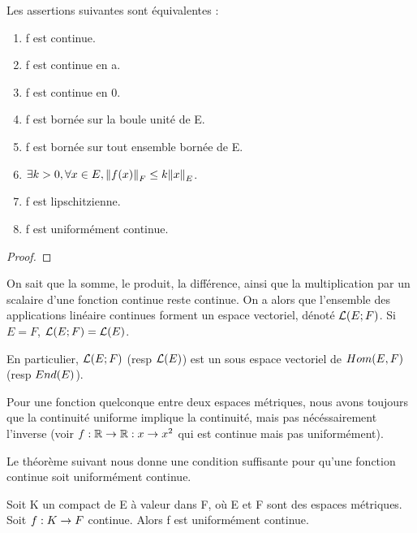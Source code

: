 \begin{proposition}
	Les assertions suivantes sont équivalentes :

	\begin{enumerate}
		\item f est continue.
		\item f est continue en a.
		\item f est continue en 0.
		\item f est bornée sur la boule unité de E.
		\item f est bornée sur tout ensemble bornée de E.
		\item $\exists k > 0, \forall x \in E, \norm{f(x)}_{F} \leq k
			\norm{x}_{E}$.
		\item f est lipschitzienne.
		\item f est uniformément continue.
	\end{enumerate}
\end{proposition}

\ifdefined\outputproof
\begin{proof}

\end{proof}
\fi

On sait que la somme, le produit, la différence, ainsi que la multiplication par
un scalaire d'une fonction continue reste continue. On a alors que l'ensemble
des applications linéaire continues forment un espace vectoriel, dénoté
$\mathcal{L}(E; F)$. Si $E = F$, $\mathcal{L}(E; F) =
\mathcal{L}(E)$.

En particulier, $\mathcal{L}(E; F)$ (resp $\mathcal{L}(E)$) est un sous
espace vectoriel de $Hom(E, F)$ (resp $End(E)$).

\begin{remarque}
	Pour une fonction quelconque entre deux espaces métriques, nous avons
	toujours que la continuité uniforme implique la continuité, mais pas
	nécéssairement l'inverse (voir $f : \mathbb{R} \rightarrow \mathbb{R} : x \rightarrow x^2$ qui est continue mais pas uniformément).
\end{remarque}

Le théorème suivant nous donne une condition suffisante pour qu'une fonction
continue soit uniformément continue.

\begin{theorem} [Heine]
	Soit K un compact de E à valeur dans F, où E et F sont des espaces
	métriques. Soit $f : K \rightarrow F$ continue. Alors f est uniformément
	continue.
	\label{Heine}
\end{theorem}

